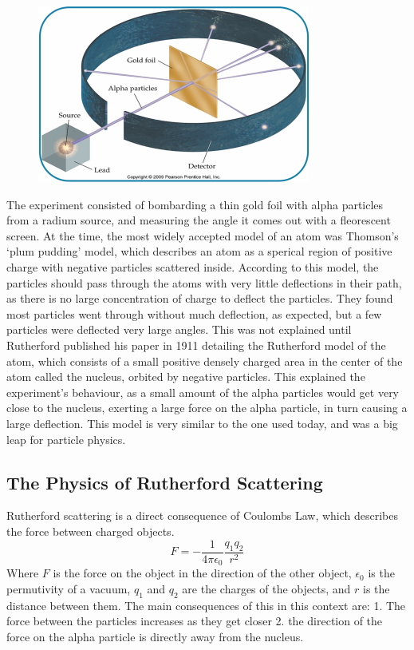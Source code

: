 \documentclass[11pt]{article}
\begin{document}
\quad
\begin{figure}[!ht]
	\centering
	\includegraphics[width=0.8\textwidth]{../images/Hnet.com-image.png}
\end{figure}

The experiment consisted of bombarding a thin gold foil with alpha
particles from a radium source, and measuring the angle it comes out
with a fleorescent screen. At the time, the most widely accepted model
of an atom was Thomson's `plum pudding' model, which describes an atom
as a sperical region of positive charge with negative particles
scattered inside. According to this model, the particles should pass
through the atoms with very little deflections in their path, as there
is no large concentration of charge to deflect the particles. They found
most particles went through without much deflection, as expected, but a
few particles were deflected very large angles. This was not explained
until Rutherford published his paper in 1911 detailing the Rutherford
model of the atom, which consists of a small positive densely charged
area in the center of the atom called the nucleus, orbited by negative
particles. This explained the experiment's behaviour, as a small amount
of the alpha particles would get very close to the nucleus, exerting a
large force on the alpha particle, in turn causing a large deflection.
This model is very similar to the one used today, and was a big leap for
particle physics.

    \hypertarget{the-physics-of-rutherford-scattering}{%
\subsection{The Physics of Rutherford
Scattering}\label{the-physics-of-rutherford-scattering}}

Rutherford scattering is a direct consequence of Coulombs Law, which
describes the force between charged objects.
\[ {F = -\frac {1}{4\pi \epsilon_{0}}\frac {q_{1}q_{2}}{r^{2}}} \] Where
\(F\) is the force on the object in the direction of the other object,
\(\epsilon_{0}\) is the permutivity of a vacuum, \(q_{1}\) and \(q_{2}\)
are the charges of the objects, and \(r\) is the distance between them.
The main consequences of this in this context are: 1. The force between
the particles increases as they get closer 2. the direction of the force
on the alpha particle is directly away from the nucleus.
\end{document}
